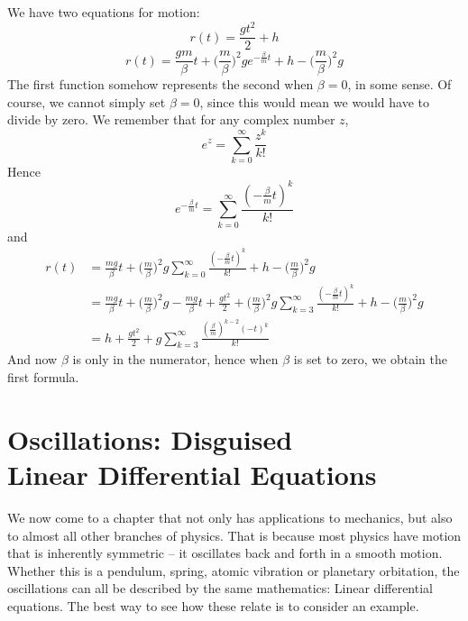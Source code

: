 We have two equations for motion:
%
\[ r(t) = \frac{gt^2}{2} + h \]
%
\[ r(t) = \frac{gm}{\beta} t + \big( \frac{m}{\beta} \big)^2 g e^{-\frac{\beta}{m}t} +  h - \big( \frac{m}{\beta} \big)^2 g \]
%
The first function somehow represents the second when $\beta = 0$, in some sense. Of course, we cannot simply set $\beta = 0$, since this would mean we would have to divide by zero. We remember that for any complex number $z$,
%
\[ e^z = \sum_{k = 0}^\infty \frac{z^k}{k!} \]
%
Hence
%
\[ e^{-\frac{\beta}{m}t} = \sum_{k = 0}^\infty \frac{(-\frac{\beta}{m}t)^k}{k!} \]
%
and
%
\begin{align*}
    r(t) &= \frac{mg}{\beta} t + \big( \frac{m}{\beta} \big)^2 g \sum_{k = 0}^\infty \frac{(-\frac{\beta}{m}t)^k}{k!} +  h - \big( \frac{m}{\beta} \big)^2 g\\
    &= \frac{mg}{\beta} t + \big( \frac{m}{\beta} \big)^2 g - \frac{mg}{\beta}t + \frac{gt^2}{2} + \big( \frac{m}{\beta} \big)^2 g \sum_{k = 3}^\infty \frac{(-\frac{\beta}{m}t)^k}{k!} +  h - \big( \frac{m}{\beta} \big)^2g\\
    &= h + \frac{gt^2}{2} + g \sum_{k = 3}^\infty \frac{(\frac{\beta}{m})^{k - 2} (-t)^k}{k!}
\end{align*}
%
And now $\beta$ is only in the numerator, hence when $\beta$ is set to zero, we obtain the first formula.

\chapter{Oscillations: Disguised\\Linear Differential Equations}

We now come to a chapter that not only has applications to mechanics, but also to almost all other branches of physics. That is because most physics have motion that is inherently symmetric -- it oscillates back and forth in a smooth motion. Whether this is a pendulum, spring, atomic vibration or planetary orbitation, the oscillations can all be described by the same mathematics: Linear differential equations. The best way to see how these relate is to consider an example.

